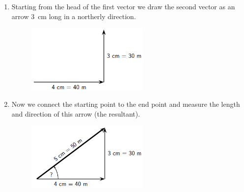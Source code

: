 {\begin{mdframed}[linewidth=4, leftmargin=40, rightmargin=40]
\begin{exercise}
\begin{enumerate}[noitemsep, label=\textbf{Step} \textbf{\arabic*}. ]
\begin{figure}[H]
 \end{figure}   

    \addtocounter{footnote}{-0}
    
          \par 
          \item  
          \label{m38815*id189754}Starting from the head of the first vector we draw the second vector as an arrow 3~cm long in a northerly direction.\par 
          \label{m38815*id189760}
            
    \setcounter{subfigure}{0}


	\begin{figure}[H] %
    \begin{center}
    \label{m38815*id189763!!!underscore!!!media}\label{m38815*id189763!!!underscore!!!printimage}\includegraphics[width=6cm]{col11305.imgs/m38815_PG11C1_047.png} %
        
      \vspace{2pt}
    \vspace{.1in}
    
    \end{center}

 \end{figure}   

    \addtocounter{footnote}{-0}
    
          \par 
          \item  
          \label{m38815*id189774}Now we connect the starting point to the end point and
measure the length and direction of this arrow (the resultant).\par 
          \label{m38815*id189778}
            
    \setcounter{subfigure}{0}


	\begin{figure}[H] %
    \begin{center}
    \label{m38815*id189781!!!underscore!!!media}\label{m38815*id189781!!!underscore!!!printimage}\includegraphics[width=6cm]{col11305.imgs/m38815_PG11C1_048.png} %
        

\end{center}
\end{figure}
\end{enumerate}
\end{exercise}
\end{mdframed}}
